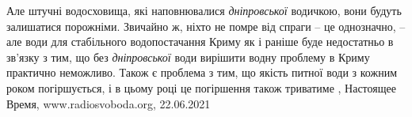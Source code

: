 Але штучні водосховища, які наповнювалися \emph{дніпровської} водичкою, вони будуть
залишатися порожніми. Звичайно ж, ніхто не помре від спраги – це однозначно, –
але води для стабільного водопостачання Криму як і раніше буде недостатньо в
зв'язку з тим, що без \emph{дніпровської} води вирішити водну проблему в Криму
практично неможливо.  Також є проблема з тим, що якість питної води з кожним
роком погіршується, і в цьому році це погіршення також триватиме
, 
Настоящее Время, www.radiosvoboda.org, 22.06.2021

